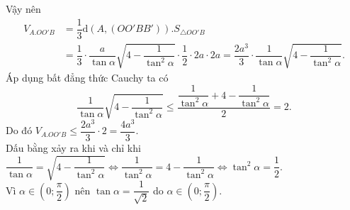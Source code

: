 \begin{ex}
{		Vậy nên
		\begin{align*}
			V_{A.O{O}'B}&=\dfrac{1}{3}\mathrm{d}\left(A,\left(O{O}'B{B}'\right)\right).S_{\triangle OO'B}\\
			&=\dfrac{1}{3}\cdot \dfrac{a}{\tan\alpha}\sqrt{4-\dfrac{1}{\tan^2\alpha}}\cdot \dfrac{1}{2}\cdot 2a\cdot 2a=\dfrac{2a^3}{3}\cdot \dfrac{1}{\tan\alpha}\sqrt{4-\dfrac{1}{\tan^2\alpha}}.
		\end{align*}
		Áp dụng bất đẳng thức Cauchy ta có $$\dfrac{1}{\tan\alpha}\sqrt{4-\dfrac{1}{\tan^2\alpha}}\le\dfrac{\dfrac{1}{\tan^2\alpha}+4-\dfrac{1}{\tan^2\alpha}}{2}=2.$$
		Do đó ${V_{A.O{O}'B}}\le\dfrac{2a^3}{3}\cdot 2=\dfrac{4a^3}{3}.$\\
		Dấu bằng xảy ra khi và chỉ khi $\dfrac{1}{\tan\alpha}=\sqrt{4-\dfrac{1}{\tan^2\alpha}}\Leftrightarrow\dfrac{1}{\tan^2\alpha}=4-\dfrac{1}{\tan^2\alpha}\Leftrightarrow{\tan^2}\alpha=\dfrac{1}{2}$.\\
		Vì $\alpha\in \left(0;\dfrac{\pi}{2}\right)$ nên $\tan\alpha=\dfrac{1}{\sqrt{2}}$ do $\alpha\in\left(0;\dfrac{\pi}{2}\right)$.}
\end{ex}
